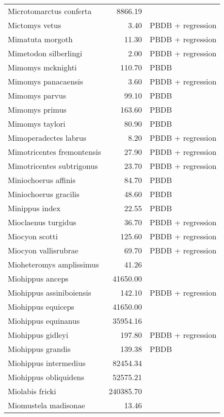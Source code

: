 \begin{table}[ht]
\begin{tabular}{lrl}
  Microtomarctus conferta & 8866.19 & \cite{Tomiya2013} \\ 
  Mictomys vetus & 3.40 & PBDB + regression \\ 
  Mimatuta morgoth & 11.30 & PBDB + regression \\ 
  Mimetodon silberlingi & 2.00 & PBDB + regression \\ 
  Mimomys mcknighti & 110.70 & PBDB \\ 
  Mimomys panacaensis & 3.60 & PBDB + regression \\ 
  Mimomys parvus & 99.10 & PBDB \\ 
  Mimomys primus & 163.60 & PBDB \\ 
  Mimomys taylori & 80.90 & PBDB \\ 
  Mimoperadectes labrus & 8.20 & PBDB + regression \\ 
  Mimotricentes fremontensis & 27.90 & PBDB + regression \\ 
  Mimotricentes subtrigonus & 23.70 & PBDB + regression \\ 
  Miniochoerus affinis & 84.70 & PBDB \\ 
  Miniochoerus gracilis & 48.60 & PBDB \\ 
  Minippus index & 22.55 & PBDB \\ 
  Mioclaenus turgidus & 36.70 & PBDB + regression \\ 
  Miocyon scotti & 125.60 & PBDB + regression \\ 
  Miocyon vallisrubrae & 69.70 & PBDB + regression \\ 
  Mioheteromys amplissimus & 41.26 & \cite{Tomiya2013} \\ 
  Miohippus anceps & 41650.00 & \cite{McKenna2011} \\ 
  Miohippus assiniboiensis & 142.10 & PBDB + regression \\ 
  Miohippus equiceps & 41650.00 & \cite{McKenna2011} \\ 
  Miohippus equinanus & 35954.16 & \cite{Tomiya2013} \\ 
  Miohippus gidleyi & 197.80 & PBDB + regression \\ 
  Miohippus grandis & 139.38 & PBDB \\ 
  Miohippus intermedius & 82454.34 & \cite{Tomiya2013} \\ 
  Miohippus obliquidens & 52575.21 & \cite{Tomiya2013} \\ 
  Miolabis fricki & 240385.70 & \cite{Tomiya2013} \\ 
  Miomustela madisonae & 13.46 & \cite{Tomiya2013} \\ 

\end{tabular}
\end{table}
